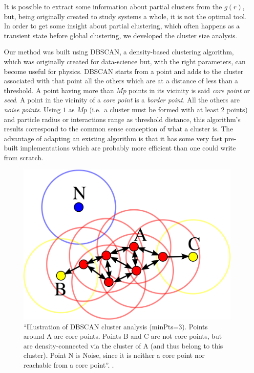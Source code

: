 \documentclass[../../master_thesis_np.tex]{subfiles}
\begin{document}
		It is possible to extract some information about partial clusters from the $g(r)$, but, being originally created to study systems a whole, it is not the optimal tool. 
		In order to get some insight about partial clustering, which often happens as a transient state before global clustering, we developed the cluster size analysis. 
		
		Our method was built using DBSCAN, a density-based clustering algorithm, which was originally created for data-science but, with the right parameters, can become useful for physics. 
		DBSCAN starts from a point and adds to the cluster associated with that point all the others which are at a distance of less than a threshold. 
		A point having more than $Mp$ points in its vicinity is said \emph{core point} or \emph{seed}. 
		A point in the vicinity of a \emph{core point} is a \emph{border point}. 
		All the others are \emph{noise points}. 
		Using $1$ as $Mp$ (i.e.\ a cluster must be formed with at least 2 points) and particle radius or interactions range as threshold distance, this algorithm's results correspond to the common sense conception of what a cluster is. 
		The advantage of adapting an existing algorithm is that it has some very fast pre-built implementations which are probably more efficient than one could write from scratch.
		
		\begin{figure}[htp]
			\centering
			\includegraphics[width=.75\textwidth]{dbscan.png}
			\caption{\enquote{Illustration of DBSCAN cluster analysis (minPts=3). Points around A are core points. Points B and C are not core points, but are density-connected via the cluster of A (and thus belong to this cluster). Point N is Noise, since it is neither a core point nor reachable from a core point}. \cite{chire_deutsch_2011}.}
			\label{fig:dbscan}
		\end{figure}
		
\end{document}
